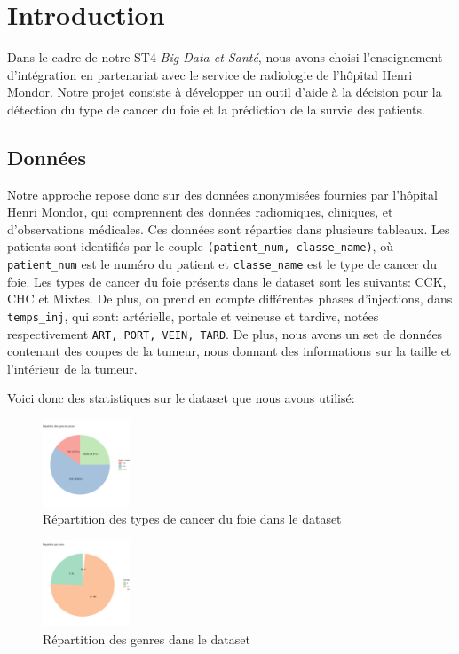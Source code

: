 \chapter{Introduction}
\label{ch:Introduction}

Dans le cadre de notre ST4 \textit{Big Data et Santé}, nous avons choisi l'enseignement d'intégration en partenariat avec le service de radiologie de l'hôpital Henri Mondor. Notre projet consiste à développer un outil d'aide à la décision pour la détection du type de cancer du foie et la prédiction de la survie des patients.

\section{Données}

Notre approche repose donc sur des données anonymisées fournies par l'hôpital Henri Mondor, qui comprennent des données radiomiques, cliniques, et d'observations médicales. Ces données sont réparties dans plusieurs tableaux. Les patients sont identifiés par le couple \texttt{(patient\_num, classe\_name)}, où \texttt{patient\_num} est le numéro du patient et \texttt{classe\_name} est le type de cancer du foie. Les types de cancer du foie présents dans le dataset sont les suivants: CCK, CHC et Mixtes. De plus, on prend en compte différentes phases d'injections, dans \texttt{temps\_inj}, qui sont: artérielle, portale et veineuse et tardive, notées respectivement \texttt{ART, PORT, VEIN, TARD}. De plus, nous avons un set de données contenant des coupes de la tumeur, nous donnant des informations sur la taille et l'intérieur de la tumeur.

Voici donc des statistiques sur le dataset que nous avons utilisé:

\begin{figure}[H]
\centering
\includegraphics[width=0.23\textwidth]{img/repartition-type.png}
\caption{Répartition des types de cancer du foie dans le dataset}
\end{figure}

\begin{figure}[H]
\centering
\includegraphics[width=0.23\textwidth]{img/repartition-genre.png}
\caption{Répartition des genres dans le dataset}
\end{figure}

